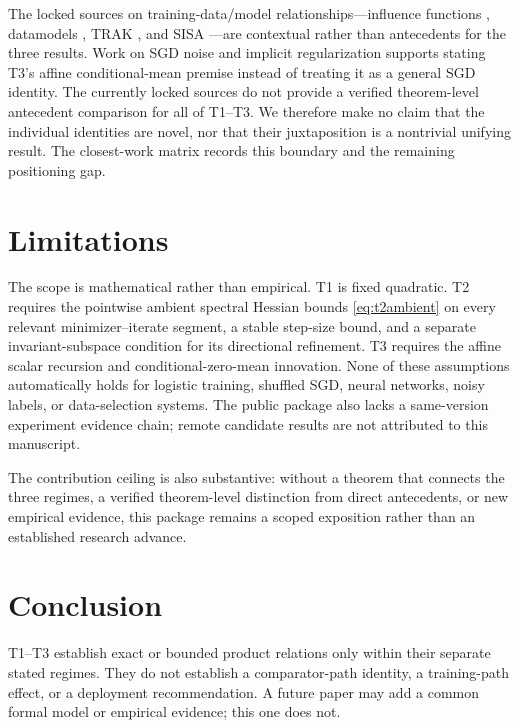 \documentclass{article}
\begin{document}
The locked sources on training-data/model relationships---influence functions
\citep{koh2017understanding}, datamodels \citep{ilyas2022datamodels}, TRAK
\citep{park2023trak}, and SISA \citep{bourtoule2021sisa}---are contextual
rather than antecedents for the three results. Work on SGD noise and implicit
regularization \citep{mandt2017sgd,smith2017bayesian,smith2021origin}
supports stating T3's affine conditional-mean premise instead of treating it
as a general SGD identity. The currently locked sources do not provide a
verified theorem-level antecedent comparison for all of T1--T3. We therefore
make no claim that the individual identities are novel, nor that their
juxtaposition is a nontrivial unifying result. The closest-work matrix records
this boundary and the remaining positioning gap.

\section{Limitations}
\label{sec:limitations}

The scope is mathematical rather than empirical. T1 is fixed quadratic. T2
requires the pointwise ambient spectral Hessian bounds
\eqref{eq:t2ambient} on every relevant minimizer--iterate segment, a stable
step-size bound, and a separate invariant-subspace condition for its directional
refinement. T3 requires the affine scalar recursion and conditional-zero-mean
innovation. None of these assumptions automatically holds for logistic
training, shuffled SGD, neural networks, noisy labels, or data-selection
systems. The public package also lacks a same-version experiment evidence
chain; remote candidate results are not attributed to this manuscript.

The contribution ceiling is also substantive: without a theorem that connects
the three regimes, a verified theorem-level distinction from direct antecedents,
or new empirical evidence, this package remains a scoped exposition rather
than an established research advance.

\section{Conclusion}

T1--T3 establish exact or bounded product relations only within their separate
stated regimes. They do not establish a comparator-path identity, a
training-path effect, or a deployment recommendation. A future paper may add a
common formal model or empirical evidence; this one does not.
\end{document}

